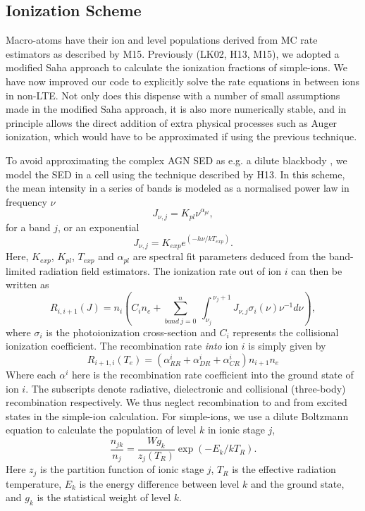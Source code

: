 \documentclass[useAMS,usenatbib]{mn2e_x}
\begin{document}
\subsection{Ionization Scheme}

Macro-atoms have their ion and level populations derived from
MC rate estimators as described by M15. Previously (LK02, H13, M15),
we adopted a modified Saha approach to calculate the ionization fractions
of simple-ions. We have now improved our code to explicitly solve the 
rate equations in between ions in non-LTE. 
Not only does this
dispense with a number of small assumptions made in the modified Saha approach, 
it is also more numerically stable, 
and in principle allows the direct addition of extra physical 
processes such as Auger ionization, which would have to be approximated 
if using the previous technique.

To avoid approximating the complex AGN SED as e.g. a dilute blackbody \citep[][M15]{ML93},
we model the SED in a cell using the technique described by H13. In this scheme,
the mean intensity in a series of bands is modeled as a normalised power law in 
frequency $\nu$
\begin{equation}
J_{\nu,j}=K_{pl}\nu^{\alpha_{pl}},
\end{equation}
for a band $j$, or an exponential 
\begin{equation}
J_{\nu,j}=K_{exp} e^{(-h\nu/k T_{exp})}.
\end{equation}
Here, $K_{exp}$, $K_{pl}$, $T_{exp}$ and $\alpha_{pl}$ are spectral fit parameters
deduced from the band-limited radiation field estimators.
The ionization rate out of ion $i$ can then be written as 
\begin{equation}
R_{i,i+1}(J)= 
\displaystyle{
n_i \left(C_{i} n_e + 
\sum_{band~j=0}^{n}~
{\int_{\nu_j}^{~\nu_j+1}{J_{\nu,j}\sigma_i(\nu)\nu^{-1}d\nu}}
\right),}
\end{equation}
where $\sigma_i$ is the photoionization cross-section and $C_{i}$
represents the collisional ionization coefficient.
The recombination rate {\em into} ion $i$ is simply given by 
\begin{equation}
R_{i+1,i}(T_e) = (\alpha^i_{RR} + \alpha^i_{DR} + \alpha^i_{CR}) n_{i+1} n_e
\end{equation}
Where each $\alpha^i$ here is the recombination rate coefficient into the ground state of ion $i$.
The subscripts denote radiative, dielectronic and 
collisional (three-body) recombination respectively.
We thus neglect recombination to and from excited states in the simple-ion calculation. 
For simple-ions, we use a dilute Boltzmann equation to calculate 
the population of level $k$ in ionic stage $j$,
\begin{equation}
\frac{n_{jk}}{n_j} = \frac{W g_k}{z_j(T_R)} \exp(-E_k/kT_R).
\end{equation}
Here $z_j$ is the partition function of ionic stage $j$,
$T_R$ is the effective radiation temperature,
$E_k$ is the energy difference between level $k$ and the ground state,
and $g_k$ is the statistical weight of level $k$. 
\end{document}
